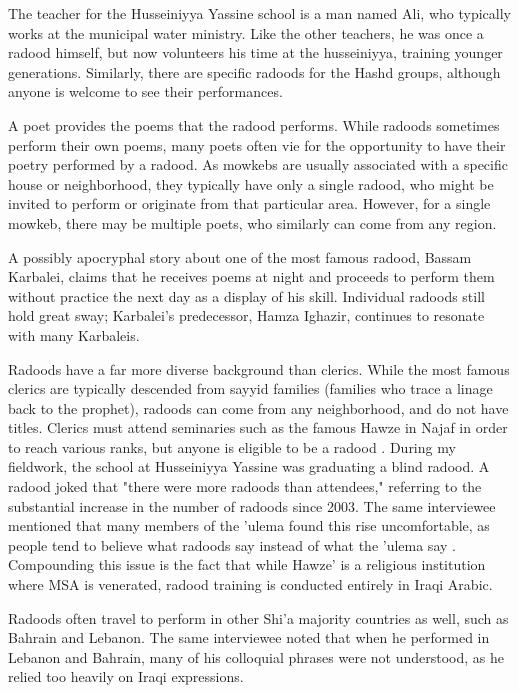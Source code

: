 The teacher for the Husseiniyya Yassine school is a man named Ali, who typically works at the municipal water ministry. Like the other teachers, he was once a radood himself, but now volunteers his time at the husseiniyya, training younger generations. Similarly, there are specific radoods for the Hashd groups, although anyone is welcome to see their performances. 

A poet provides the poems that the radood performs. While radoods sometimes perform their own poems, many poets often vie for the opportunity to have their poetry performed by a radood. As mowkebs are usually associated with a specific house or neighborhood, they typically have only a single radood, who might be invited to perform or originate from that particular area. However, for a single mowkeb, there may be multiple poets, who similarly can come from any region. 

A possibly apocryphal story about one of the most famous radood, Bassam Karbalei, claims that he receives poems at night and proceeds to perform them without practice the next day as a display of his skill\cite{al-husseini_interview_2022}. Individual radoods still hold great sway; Karbalei's predecessor, Hamza Ighazir, continues to resonate with many Karbaleis. 

Radoods have a far more diverse background than clerics. While the most famous clerics are typically descended from sayyid families (families who trace a linage back to the prophet), radoods can come from any neighborhood, and do not have titles. Clerics must attend seminaries such as the famous Hawze in Najaf in order to reach various ranks, but anyone is eligible to be a radood \cite{al-husseini_interview_2022}. During my fieldwork, the school at Husseiniyya Yassine was graduating a blind radood. A radood joked that "there were more radoods than attendees," referring to the substantial increase in the number of radoods since 2003. The same interviewee mentioned that many members of the 'ulema found this rise uncomfortable, as people tend to believe what radoods say instead of what the 'ulema say \cite{al-husseini_interview_2022}. Compounding this issue is the fact that while Hawze' is a religious institution where MSA is venerated, radood training is conducted entirely in Iraqi Arabic. 

Radoods often travel to perform in other Shi'a majority countries as well, such as Bahrain and Lebanon. The same interviewee noted that when he performed in Lebanon and Bahrain, many of his colloquial phrases were not understood, as he relied too heavily on Iraqi expressions.

